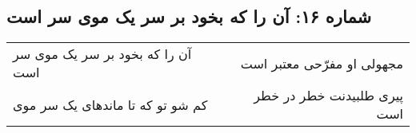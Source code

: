 \begin{center}
\section*{شماره ۱۶: آن را که بخود بر سر یک موی سر است}
\label{sec:016}
\begin{longtable}{l p{0.5cm} r}
آن را که بخود بر سر یک موی سر است
&&
مجهولی او مفرّحی معتبر است
\\
کم شو تو که تا ماندهای یک سر موی
&&
پیری طلبیدنت خطر در خطر است
\\
\end{longtable}
\end{center}
